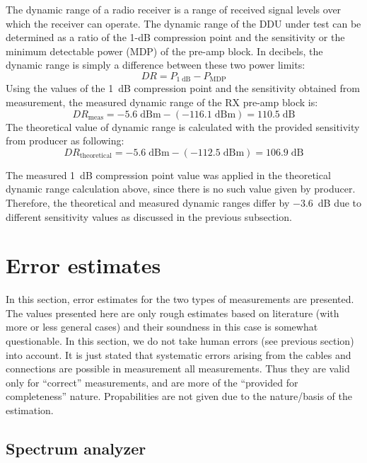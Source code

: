 \documentclass[a4paper, 12pt]{article}
\begin{document}
The dynamic range of a radio receiver is a range of received signal levels over which the receiver 
can operate. The dynamic range of the DDU under test can be determined as a ratio of the 1-dB 
compression point and the sensitivity or the minimum detectable power (MDP) of the pre-amp block. 
In decibels, the dynamic range is simply a difference between these two power limits:
\begin{equation}
\mathit{DR} = P_\mathrm{1\;dB} - P_\mathrm{MDP} 
\end{equation}
Using the values of the 1~dB compression point and the sensitivity obtained from measurement, the 
measured dynamic range of the RX pre-amp block is:
\begin{equation}
\mathit{DR}_\mathrm{meas} = -5.6 \mathrm{\;dBm} - (-116.1 \mathrm{\;dBm}) = 110.5 \mathrm{\;dB}
\end{equation}
The theoretical value of dynamic range is calculated with the provided sensitivity from producer as 
following:
\begin{equation}
\mathit{DR}_\mathrm{theoretical} = -5.6 \mathrm{\;dBm} - (-112.5 \mathrm{\;dBm}) = 106.9 \mathrm{\;dB}
\end{equation}

The measured 1~dB compression point value was applied in the theoretical dynamic range calculation 
above, since there is no such value given by producer. Therefore, the theoretical and measured dynamic 
ranges differ by $-3.6$~dB due to different sensitivity values as discussed in the 
previous subsection.


\newpage
\section{Error estimates}

In this section, error estimates for the two types of measurements are presented.
The values presented here are only rough estimates based on literature (with more 
or less general cases) and their soundness in this case is somewhat questionable. 
In this section, we do not take human errors (see previous section) into account. 
It is just stated that systematic errors arising from the cables and connections 
are possible in measurement all measurements. Thus they are valid only for 
``correct'' measurements, and are more of the ``provided for completeness'' 
nature. Propabilities are not given due to the nature/basis of the estimation.


\subsection{Spectrum analyzer}
\end{document}
